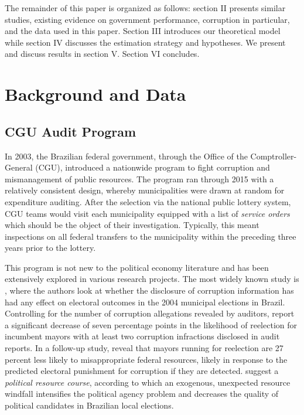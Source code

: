 \documentclass[11pt]{article}
\begin{document}
The remainder of this paper is organized as follows: section II presents similar studies, existing evidence on government performance, corruption in particular, and the data used in this paper. Section III introduces our theoretical model while section IV discusses the estimation strategy and hypotheses. We present and discuss results in section V. Section VI concludes.

\section{Background and Data} \label{sec:background}

\subsection{CGU Audit Program} \label{subsec:auditprogram}

In 2003, the Brazilian federal government, through the Office of the Comptroller-General (CGU), introduced a nationwide program to fight corruption and mismanagement of public resources. The program ran through 2015 with a relatively consistent design, whereby municipalities were drawn at random for expenditure auditing. After the selection via the national public lottery system, CGU teams would visit each municipality equipped with a list of \emph{service orders} which should be the object of their investigation. Typically, this meant inspections on all federal transfers to the municipality within the preceding three years prior to the lottery.

This program is not new to the political economy literature and has been extensively explored in various research projects. The most widely known study is \citet{FerrazExposingCorruptPoliticians2008b}, where the authors look at whether the disclosure of corruption information has had any effect on electoral outcomes in the 2004 municipal elections in Brazil. Controlling for the number of corruption allegations revealed by auditors, \citet{FerrazExposingCorruptPoliticians2008b} report a significant decrease of seven percentage points in the likelihood of reelection for incumbent mayors with at least two corruption infractions disclosed in audit reports. In a follow-up study, \citet{FerrazElectoralAccountabilityCorruption2011a} reveal that mayors running for reelection are 27 percent less likely to misappropriate federal resources, likely in response to the predicted electoral punishment for corruption if they are detected. \citet{BrolloPoliticalResourceCurse2013} suggest a \emph{political resource course}, according to which an exogenous, unexpected resource windfall intensifies the political agency problem and decreases the quality of political candidates in Brazilian local elections.
\end{document}
